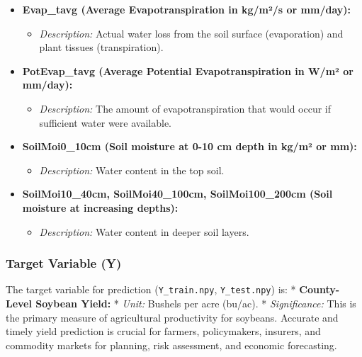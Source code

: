 \documentclass[
  letterpaper,
  DIV=11,
  numbers=noendperiod]{scrreprt}
\providecommand{\tightlist}{%
  \setlength{\itemsep}{0pt}\setlength{\parskip}{0pt}}\usepackage{longtable,booktabs,array}
\begin{document}
\begin{itemize}
  \begin{itemize}
  \tightlist
  \item
    \emph{Description:} Measure of atmospheric dryness (the difference
    between how much moisture the air can hold and how much it actually
    holds).
  \end{itemize}
\item
  \textbf{Evap\_tavg (Average Evapotranspiration in kg/m²/s or mm/day):}

  \begin{itemize}
  \tightlist
  \item
    \emph{Description:} Actual water loss from the soil surface
    (evaporation) and plant tissues (transpiration).
  \end{itemize}
\item
  \textbf{PotEvap\_tavg (Average Potential Evapotranspiration in W/m² or
  mm/day):}

  \begin{itemize}
  \tightlist
  \item
    \emph{Description:} The amount of evapotranspiration that would
    occur if sufficient water were available.
  \end{itemize}
\item
  \textbf{SoilMoi0\_10cm (Soil moisture at 0-10 cm depth in kg/m² or
  mm):}

  \begin{itemize}
  \tightlist
  \item
    \emph{Description:} Water content in the top soil.
  \end{itemize}
\item
  \textbf{SoilMoi10\_40cm, SoilMoi40\_100cm, SoilMoi100\_200cm (Soil
  moisture at increasing depths):}

  \begin{itemize}
  \tightlist
  \item
    \emph{Description:} Water content in deeper soil layers.
  \end{itemize}
\end{itemize}

\subsubsection{Target Variable (Y)}\label{target-variable-y}

The target variable for prediction (\texttt{Y\_train.npy},
\texttt{Y\_test.npy}) is: * \textbf{County-Level Soybean Yield:} *
\emph{Unit:} Bushels per acre (bu/ac). * \emph{Significance:} This is
the primary measure of agricultural productivity for soybeans. Accurate
and timely yield prediction is crucial for farmers, policymakers,
insurers, and commodity markets for planning, risk assessment, and
economic forecasting.
\end{document}
